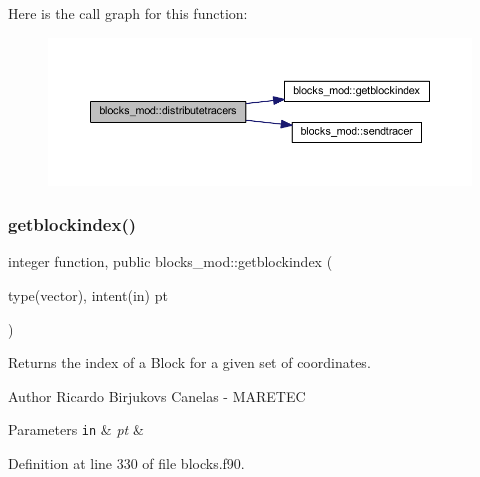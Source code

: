 Here is the call graph for this function\+:\nopagebreak
\begin{figure}[H]
\begin{center}
\leavevmode
\includegraphics[width=350pt]{namespaceblocks__mod_aa178415bcc40cf169744d356e1a09c6b_cgraph}
\end{center}
\end{figure}
\mbox{\label{namespaceblocks__mod_a62e8fb0d6b2535b4499c7a4d848c24ba}} 
\subsubsection{\texorpdfstring{getblockindex()}{getblockindex()}}
{\footnotesize\ttfamily integer function, public blocks\+\_\+mod\+::getblockindex (\begin{DoxyParamCaption}\item[{type(vector), intent(in)}]{pt }\end{DoxyParamCaption})}



Returns the index of a Block for a given set of coordinates. 

\begin{DoxyAuthor}{Author}
Ricardo Birjukovs Canelas -\/ M\+A\+R\+E\+T\+EC 
\end{DoxyAuthor}

\begin{DoxyParams}[1]{Parameters}
\mbox{\tt in}  & {\em pt} & \\
\hline
\end{DoxyParams}


Definition at line 330 of file blocks.\+f90.



